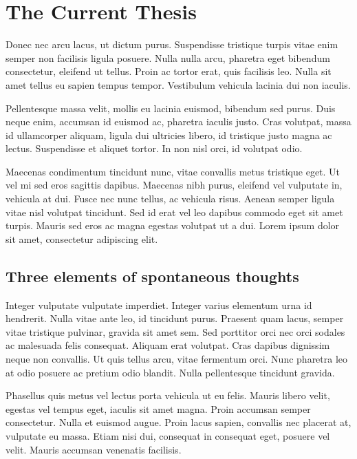 \chapter{The Current Thesis}
\label{ch:cur}

\newpage

Donec nec arcu lacus, ut dictum purus. Suspendisse tristique turpis vitae enim semper non facilisis ligula posuere. Nulla nulla arcu, pharetra eget bibendum consectetur, eleifend ut tellus. Proin ac tortor erat, quis facilisis leo. Nulla sit amet tellus eu sapien tempus tempor. Vestibulum vehicula lacinia dui non iaculis. 

Pellentesque massa velit, mollis eu lacinia euismod, bibendum sed purus. Duis neque enim, accumsan id euismod ac, pharetra iaculis justo. Cras volutpat, massa id ullamcorper aliquam, ligula dui ultricies libero, id tristique justo magna ac lectus. Suspendisse et aliquet tortor. In non nisl orci, id volutpat odio. 

Maecenas condimentum tincidunt nunc, vitae convallis metus tristique eget. Ut vel mi sed eros sagittis dapibus. Maecenas nibh purus, eleifend vel vulputate in, vehicula at dui. Fusce nec nunc tellus, ac vehicula risus. Aenean semper ligula vitae nisl volutpat tincidunt. Sed id erat vel leo dapibus commodo eget sit amet turpis. Mauris sed eros ac magna egestas volutpat ut a dui. Lorem ipsum dolor sit amet, consectetur adipiscing elit.


\section{Three elements of spontaneous thoughts}
Integer vulputate vulputate imperdiet. Integer varius elementum urna id hendrerit. Nulla vitae ante leo, id tincidunt purus. Praesent quam lacus, semper vitae tristique pulvinar, gravida sit amet sem. Sed porttitor orci nec orci sodales ac malesuada felis consequat. Aliquam erat volutpat. Cras dapibus dignissim neque non convallis. Ut quis tellus arcu, vitae fermentum orci. Nunc pharetra leo at odio posuere ac pretium odio blandit. Nulla pellentesque tincidunt gravida. 

Phasellus quis metus vel lectus porta vehicula ut eu felis. Mauris libero velit, egestas vel tempus eget, iaculis sit amet magna. Proin accumsan semper consectetur. Nulla et euismod augue. Proin lacus sapien, convallis nec placerat at, vulputate eu massa. Etiam nisi dui, consequat in consequat eget, posuere vel velit. Mauris accumsan venenatis facilisis.

